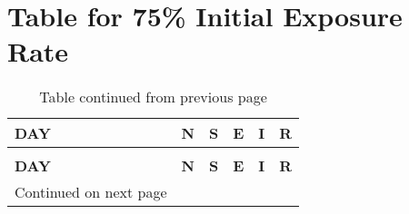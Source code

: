 \chapter{Table for 75\% Initial Exposure Rate}


\begin{longtable}{|l|l|l|l|l|l|}
	\caption{75\% Initial Exposure Rate} \\
	
	\toprule
	\textbf{DAY} & \textbf{N} & \textbf{S} & \textbf{E }& \textbf{I} &\textbf{ R} \\
	\midrule
	\endfirsthead
	\caption*{Table continued from previous page} \\
	\toprule
	\textbf{DAY} & \textbf{N} & \textbf{S} & \textbf{E }& \textbf{I} &\textbf{ R} \\
	\midrule
	\endhead
	\midrule
	\multicolumn{1}{r}{\footnotesize Continued on next page}
	\endfoot
	\bottomrule
	\endlastfoot
	

\end{longtable}
